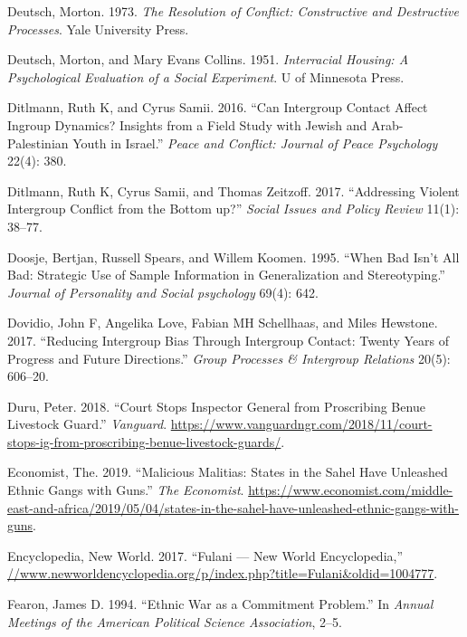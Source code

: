 \documentclass[11pt]{article}
\begin{document}
\leavevmode\hypertarget{ref-deutsch1973resolution}{}%
Deutsch, Morton. 1973. \emph{The Resolution of Conflict: Constructive
and Destructive Processes}. Yale University Press.

\leavevmode\hypertarget{ref-deutsch1951interracial}{}%
Deutsch, Morton, and Mary Evans Collins. 1951. \emph{Interracial
Housing: A Psychological Evaluation of a Social Experiment}. U of
Minnesota Press.

\leavevmode\hypertarget{ref-ditlmann2016can}{}%
Ditlmann, Ruth K, and Cyrus Samii. 2016. ``Can Intergroup Contact Affect
Ingroup Dynamics? Insights from a Field Study with Jewish and
Arab-Palestinian Youth in Israel.'' \emph{Peace and Conflict: Journal of
Peace Psychology} 22(4): 380.

\leavevmode\hypertarget{ref-ditlmann2017addressing}{}%
Ditlmann, Ruth K, Cyrus Samii, and Thomas Zeitzoff. 2017. ``Addressing
Violent Intergroup Conflict from the Bottom up?'' \emph{Social Issues
and Policy Review} 11(1): 38--77.

\leavevmode\hypertarget{ref-doosje1995bad}{}%
Doosje, Bertjan, Russell Spears, and Willem Koomen. 1995. ``When Bad
Isn't All Bad: Strategic Use of Sample Information in Generalization and
Stereotyping.'' \emph{Journal of Personality and Social psychology}
69(4): 642.

\leavevmode\hypertarget{ref-dovidio2017reducing}{}%
Dovidio, John F, Angelika Love, Fabian MH Schellhaas, and Miles
Hewstone. 2017. ``Reducing Intergroup Bias Through Intergroup Contact:
Twenty Years of Progress and Future Directions.'' \emph{Group Processes
\& Intergroup Relations} 20(5): 606--20.

\leavevmode\hypertarget{ref-duru2018court}{}%
Duru, Peter. 2018. ``Court Stops Inspector General from Proscribing
Benue Livestock Guard.'' \emph{Vanguard}.
\url{https://www.vanguardngr.com/2018/11/court-stops-ig-from-proscribing-benue-livestock-guards/}.

\leavevmode\hypertarget{ref-economist2019militias}{}%
Economist, The. 2019. ``Malicious Malitias: States in the Sahel Have
Unleashed Ethnic Gangs with Guns.'' \emph{The Economist}.
\url{https://www.economist.com/middle-east-and-africa/2019/05/04/states-in-the-sahel-have-unleashed-ethnic-gangs-with-guns}.

\leavevmode\hypertarget{ref-fulanisize2017}{}%
Encyclopedia, New World. 2017. ``Fulani --- New World Encyclopedia,''
\url{//www.newworldencyclopedia.org/p/index.php?title=Fulani\&oldid=1004777}.

\leavevmode\hypertarget{ref-fearon1994ethnic}{}%
Fearon, James D. 1994. ``Ethnic War as a Commitment Problem.'' In
\emph{Annual Meetings of the American Political Science Association},
2--5.
\end{document}
